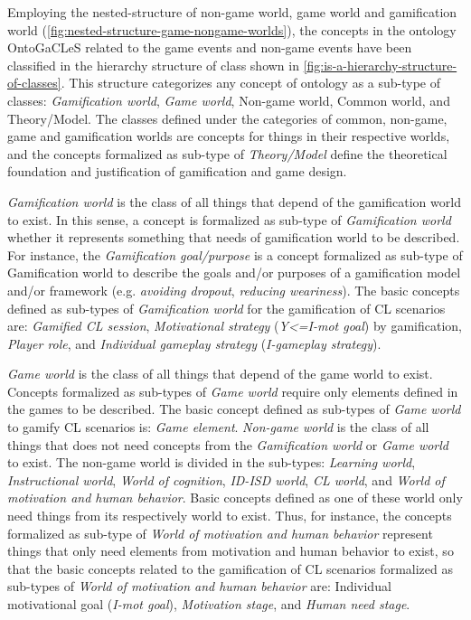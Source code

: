 Employing the nested-structure of non-game world, game world and gamification world (\autoref{fig:nested-structure-game-nongame-worlds}), the concepts in the ontology OntoGaCLeS related to the game events and non-game events have been classified in the  hierarchy structure of class shown in \autoref{fig:is-a-hierarchy-structure-of-classes}. This structure categorizes any concept of ontology as a sub-type of classes: \emph{Gamification world}, \emph{Game world}, Non-game world, Common world, and Theory/Model. The classes defined under the categories of common, non-game, game and gamification worlds are concepts for things in their respective worlds, and the concepts formalized as sub-type of \emph{Theory/Model} define the theoretical foundation and justification of gamification and game design.

\emph{Gamification world} is the class of all things that depend of the gamification world to exist. In this sense, a concept is formalized as sub-type of \emph{Gamification world} whether it represents something that needs of gamification world to be described. For instance, the \emph{Gamification goal/purpose} is a concept formalized as sub-type of Gamification world to describe the goals and/or purposes of a gamification model and/or framework (e.g. \emph{avoiding dropout}, \emph{reducing weariness}). The basic concepts defined as sub-types of \emph{Gamification world} for the gamification of CL scenarios are: \emph{Gamified CL session}, \emph{Motivational strategy}  (\emph{Y<=I-mot goal}) by gamification, \emph{Player role}, and \emph{Individual gameplay strategy} (\emph{I-gameplay strategy}).

\emph{Game world} is the class of all things that depend of the game world to exist. Concepts formalized as sub-types of \emph{Game world} require only elements defined in the games to be described. The basic concept defined as sub-types of \emph{Game world} to gamify CL scenarios is: \emph{Game element}. \emph{Non-game world} is the class of all things that does not need concepts from the \emph{Gamification world} or \emph{Game world} to exist. The non-game world is divided in the sub-types: \emph{Learning world}, \emph{Instructional world}, \emph{World of cognition}, \emph{ID-ISD world}, \emph{CL world}, and \emph{World of motivation and human behavior}. Basic concepts defined as one of these world only need things from its respectively world to exist. Thus, for instance, the concepts formalized as sub-type of \emph{World of motivation and human behavior} represent things that only need elements from motivation and human behavior to exist, so that the basic concepts related to the gamification of CL scenarios formalized as sub-types of \emph{World of motivation and human behavior} are: Individual motivational goal (\emph{I-mot goal}), \emph{Motivation stage}, and \emph{Human need stage}.

